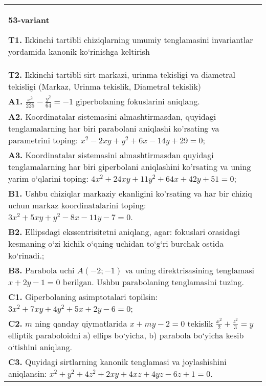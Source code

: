 \documentclass{article}
\begin{document}
\begin{tabular}{m{17cm}}
\textbf{53-variant}
\newline

\textbf{T1.} Ikkinchi tartibli chiziqlarning umumiy tenglamasini invariantlar yordamida kanonik ko‘rinishga keltirish \\
\textbf{T2.} Ikkinchi tartibli sirt markazi, urinma tekisligi va diametral tekisligi (Markaz, Urinma tekislik, Diametral tekislik) \\
\textbf{A1.} $\frac{x^2}{225}-\frac{y^2}{64}=-1$ giperbolaning fokuslarini aniqlang. \\
\textbf{A2.} Koordinatalar sistemasini almashtirmasdan, quyidagi tenglamalarning har biri parabolani aniqlashi ko'rsating va parametrini toping: $x^2-2 x y+y^2+6 x-14 y+29=0$; \\
\textbf{A3.} Koordinatalar sistemasini almashtirmasdan quyidagi tenglamalarning har biri giperbolani aniqlashini ko'rsating va uning yarim o‘qlarini toping: $4 x^2+24 x y+11 y^2+64 x+42 y+51=0$; \\
\textbf{B1.} Ushbu chiziqlar markaziy ekanligini ko'rsating va har bir chiziq uchun markaz koordinatalarini toping: $3x^2+5xy+y^2-8x-11y-7=0$. \\
\textbf{B2.} Ellipsdagi ekssentrisitetni aniqlang, agar: fokuslari orasidagi kesmaning o‘zi kichik o‘qning uchidan to‘g‘ri burchak ostida ko‘rinadi.; \\
\textbf{B3.} Parabola uchi $A(-2;-1)$ va uning direktrisasining tenglamasi $x+2y-1=0$ berilgan. Ushbu parabolaning tenglamasini tuzing. \\
\textbf{C1.} Giperbolaning asimptotalari topilsin: $3 x^2+7 x y+4 y^2+5 x+2 y-6=0$; \\
\textbf{C2.} $m$ ning qanday qiymatlarida $x+m y-2=0$ tekislik $\frac{x^2}{2}+\frac{z^2}{3}=y$ elliptik paraboloidni a) ellips bo‘yicha, b) parabola bo‘yicha kesib o‘tishini aniqlang. \\
\textbf{C3.} Quyidagi sirtlarning kanonik tenglamasi va joylashishini aniqlansin: $x^2+y^2+4 z^2+2 x y+4 x z+4 y z-6 z+1=0$. \\

\end{tabular}
\vspace{1cm}
\end{document}
